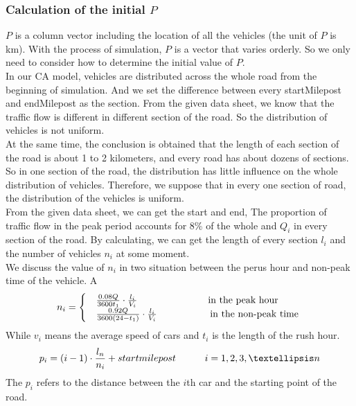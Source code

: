 \documentclass{mcmthesis}
\begin{document}
\subsubsection{Calculation of the initial $P$}
\indent $P$ is a column vector including the location of all the vehicles (the unit of $P$ is km). With the process of simulation, $P$ is a vector that varies orderly. So we only need to consider how to determine the initial value of $P$.\\
\indent In our CA model, vehicles are distributed across the whole road from the beginning of simulation. And we set the difference between every startMilepost and endMilepost as the section. From the given data sheet, we know that the traffic flow is different in different section of the road. So the distribution of vehicles is not uniform.\\
\indent At the same time, the conclusion is obtained that the length of each section of the road is about 1 to 2 kilometers, and every road has about dozens of sections. So in one section of the road, the distribution has little influence on the whole distribution of vehicles. Therefore, we suppose that in every one section of road, the distribution of the vehicles is uniform. \\
\indent From the given data sheet, we can get the start and end, The proportion of traffic flow in the peak period accounts for 8\% of the whole and $Q_{i}$ in every section of the road. By calculating, we can get the length of every section $l_{i}$ and the number of vehicles $n_{i}$ at some moment.\\
\indent We discuss the value of $n_{i}$ in two situation between the perus hour and non-peak time of the vehicle. A
\begin{equation}
	n_{i}=\begin{cases}
	&\frac{0.08Q}{3600t_{1}}\cdot\frac{l_{i}}{V_{i}} \indent\indent\indent \indent\quad\text{\,\,in the peak hour }\\ 
	&\frac{0.92Q}{3600(24-t_{1})}\cdot\frac{l_{i}}{V_{i}}\indent\indent\indent \quad\text{in the non-peak time } 
	\end{cases}
\end{equation}
\indent While $v_{i}$ means the average speed of cars and $t_{i}$ is the length of the rush hour.\\
\begin{equation}
	p_i=(i-1)\cdot\frac{l_{n}}{n_{i}}+startmilepost \indent \indent	i=1,2,3,…n
\end{equation}
\indent The $p_{i}$ refers to the distance between the $i$th car and the starting point of the road.
\end{document}
